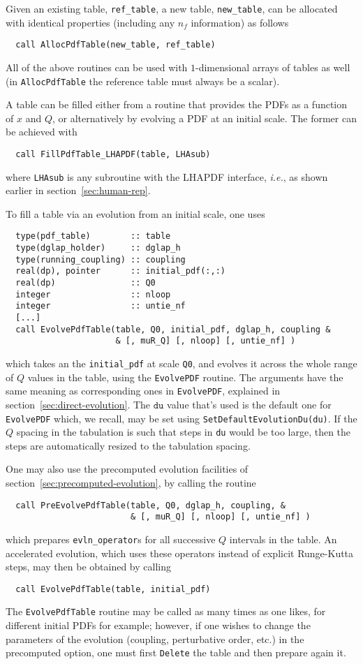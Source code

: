 \documentclass[12pt]{article}
\newcommand{\ttt}[1]{\texttt{#1}}
\begin{document}
Given an existing table, \ttt{ref\_table}, a new table,
\ttt{new\_table}, can be allocated with identical properties
(including any $n_f$ information) as follows
\begin{lstlisting}
  call AllocPdfTable(new_table, ref_table)
\end{lstlisting}
All of the above routines can be used with $1$-dimensional arrays of
tables as well (in \ttt{AllocPdfTable} the reference table must always
be a scalar).

A table can be filled either from a routine that provides the PDFs as
a function of $x$ and $Q$, or alternatively by evolving a PDF at an
initial scale. The former can be achieved with
\begin{lstlisting}
  call FillPdfTable_LHAPDF(table, LHAsub)
\end{lstlisting}
where \ttt{LHAsub} is any subroutine with the LHAPDF interface,
{\it i.e.}, as shown earlier
in section~\ref{sec:human-rep}.

To fill a table via an evolution from an initial scale, one uses 
\begin{lstlisting}
  type(pdf_table)        :: table
  type(dglap_holder)     :: dglap_h
  type(running_coupling) :: coupling
  real(dp), pointer      :: initial_pdf(:,:)
  real(dp)               :: Q0
  integer                :: nloop
  integer                :: untie_nf
  [...]
  call EvolvePdfTable(table, Q0, initial_pdf, dglap_h, coupling &
                      & [, muR_Q] [, nloop] [, untie_nf] )
\end{lstlisting}
which takes an the \ttt{initial\_pdf} at scale \ttt{Q0}, and evolves
it across the whole range of $Q$ values in the table, using the
\ttt{EvolvePDF} routine. The arguments have the same meaning as
corresponding ones in \ttt{EvolvePDF}, explained in
section~\ref{sec:direct-evolution}. The $\ttt{du}$ value that's used
is the default one for \ttt{EvolvePDF} which, we recall, may be set
using \ttt{SetDefaultEvolutionDu(du)}. If the $Q$ spacing in the
tabulation is such that steps in \ttt{du} would be too large, then the
steps are automatically resized to the tabulation spacing.

One may also use the precomputed evolution facilities of
section~\ref{sec:precomputed-evolution}, by calling the routine
\begin{lstlisting}
  call PreEvolvePdfTable(table, Q0, dglap_h, coupling, &
                         & [, muR_Q] [, nloop] [, untie_nf] )
\end{lstlisting}
which prepares \ttt{evln\_operator}s for all successive $Q$ intervals in the
table. An accelerated evolution, which uses these operators instead of
explicit Runge-Kutta steps, may then be obtained by calling
\begin{lstlisting}
  call EvolvePdfTable(table, initial_pdf)
\end{lstlisting}
The \ttt{EvolvePdfTable} routine may be called as many times as one
likes, for different initial PDFs for example;
however, if one wishes to change the parameters of
the evolution (coupling, perturbative order, etc.) 
in the precomputed option, one must
first \ttt{Delete} the table and then prepare again it.
\end{document}
